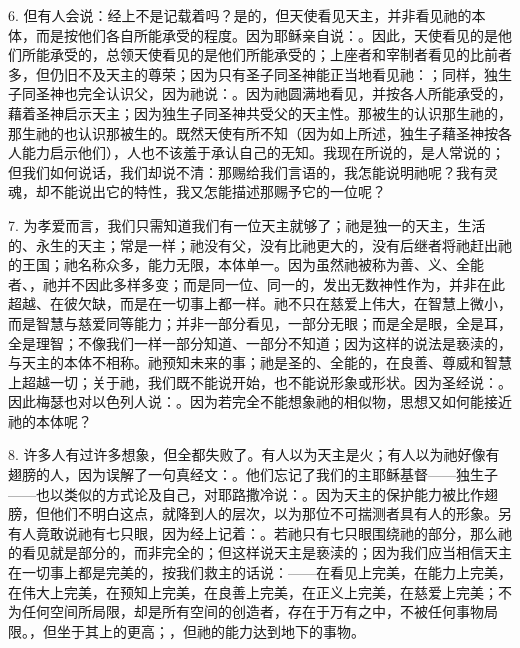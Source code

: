 6. 但有人会说：经上不是记载着吗？是的，但天使看见天主，并非看见祂的本体，而是按他们各自所能承受的程度。因为耶稣亲自说：。因此，天使看见的是他们所能承受的，总领天使看见的是他们所能承受的；上座者和宰制者看见的比前者多，但仍旧不及天主的尊荣；因为只有圣子同圣神能正当地看见祂：；同样，独生子同圣神也完全认识父，因为祂说：。因为祂圆满地看见，并按各人所能承受的，藉着圣神启示天主；因为独生子同圣神共受父的天主性。那被生的认识那生祂的，那生祂的也认识那被生的。既然天使有所不知（因为如上所述，独生子藉圣神按各人能力启示他们），人也不该羞于承认自己的无知。我现在所说的，是人常说的；但我们如何说话，我们却说不清：那赐给我们言语的，我怎能说明祂呢？我有灵魂，却不能说出它的特性，我又怎能描述那赐予它的一位呢？\par

7. 为孝爱而言，我们只需知道我们有一位天主就够了；祂是独一的天主，生活的、永生的天主；常是一样；祂没有父，没有比祂更大的，没有后继者将祂赶出祂的王国；祂名称众多，能力无限，本体单一。因为虽然祂被称为善、义、全能者、，祂并不因此多样多变；而是同一位、同一的，发出无数神性作为，并非在此超越、在彼欠缺，而是在一切事上都一样。祂不只在慈爱上伟大，在智慧上微小，而是智慧与慈爱同等能力；并非一部分看见，一部分无眼；而是全是眼，全是耳，全是理智；不像我们一样一部分知道、一部分不知道；因为这样的说法是亵渎的，与天主的本体不相称。祂预知未来的事；祂是圣的、全能的，在良善、尊威和智慧上超越一切；关于祂，我们既不能说开始，也不能说形象或形状。因为圣经说：。因此梅瑟也对以色列人说：。因为若完全不能想象祂的相似物，思想又如何能接近祂的本体呢？\par

8. 许多人有过许多想象，但全都失败了。有人以为天主是火；有人以为祂好像有翅膀的人，因为误解了一句真经文：。他们忘记了我们的主耶稣基督——独生子——也以类似的方式论及自己，对耶路撒冷说：。因为天主的保护能力被比作翅膀，但他们不明白这点，就降到人的层次，以为那位不可揣测者具有人的形象。另有人竟敢说祂有七只眼，因为经上记着：。若祂只有七只眼围绕祂的部分，那么祂的看见就是部分的，而非完全的；但这样说天主是亵渎的；因为我们应当相信天主在一切事上都是完美的，按我们救主的话说：——在看见上完美，在能力上完美，在伟大上完美，在预知上完美，在良善上完美，在正义上完美，在慈爱上完美；不为任何空间所局限，却是所有空间的创造者，存在于万有之中，不被任何事物局限。，但坐于其上的更高；，但祂的能力达到地下的事物。\par

